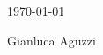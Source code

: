 \documentclass[10pt,a4paper,roman]{moderncv}        %
\begin{document}
\vfill
\begin{flushleft}
\today\\
\end{flushleft}
\begin{flushright}
\vspace{1cm}
Gianluca Aguzzi
\end{flushright}

\end{document}
